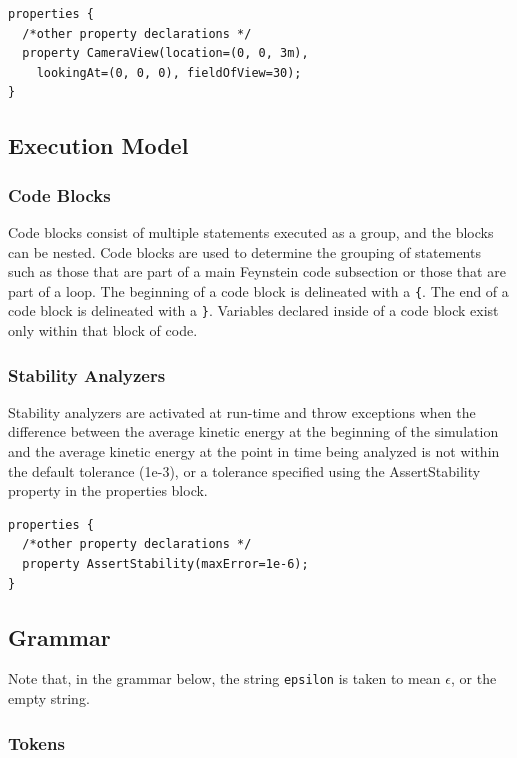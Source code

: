 \begin{verbatim}
properties {
  /*other property declarations */
  property CameraView(location=(0, 0, 3m), 
    lookingAt=(0, 0, 0), fieldOfView=30);
}
\end{verbatim}

\subsection{Execution Model}

\subsubsection{Code Blocks}
Code blocks consist of multiple statements executed as a group, and
the blocks can be nested. Code blocks are used to determine the
grouping of statements such as those that are part of a main Feynstein
code subsection or those that are part of a loop. The beginning of a code
block is delineated with a \texttt{\{}. The end of a code block is delineated
with a \texttt{\}}. Variables declared inside of a code block exist only
within that block of code.

\subsubsection{Stability Analyzers}

Stability analyzers are activated at run-time and throw exceptions
when the difference between the average kinetic energy at the
beginning of the simulation and the average kinetic energy at the
point in time being analyzed is not within the default tolerance
(1e-3), or a tolerance specified using the AssertStability property in
the properties block.

\begin{verbatim}
properties {
  /*other property declarations */
  property AssertStability(maxError=1e-6);
}
\end{verbatim}

\subsection{Grammar}

Note that, in the grammar below, the string \texttt{epsilon} is taken
to mean $\epsilon$, or the empty string.

\subsubsection{Tokens}

